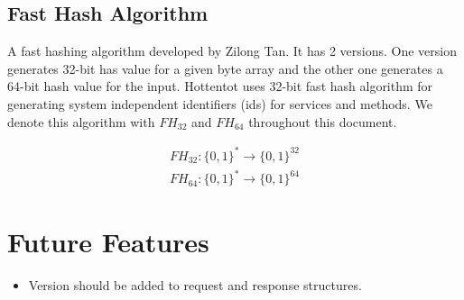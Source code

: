 \documentclass[10pt,a4paper]{article}
\begin{document}
\subsection{Fast Hash Algorithm}
A fast hashing algorithm developed by Zilong Tan. It has 2 versions. One version generates 32-bit has value for a given byte array and the other one generates a 64-bit hash value for the input. Hottentot uses 32-bit fast hash algorithm for generating system independent identifiers (ids) for services and methods. We denote this algorithm with $ FH_{32} $ and $ FH_{64} $ throughout this document.

\begin{equation}
\begin{split}
  FH_{32}: \{0, 1\}^* \to \{0, 1\}^{32}  \\
  FH_{64}: \{0, 1\}^* \to \{0, 1\}^{64}
\end{split}
\end{equation}


\section{Future Features}
\begin{itemize}
  \item Version should be added to request and response structures.
\end{itemize}
\end{document}
